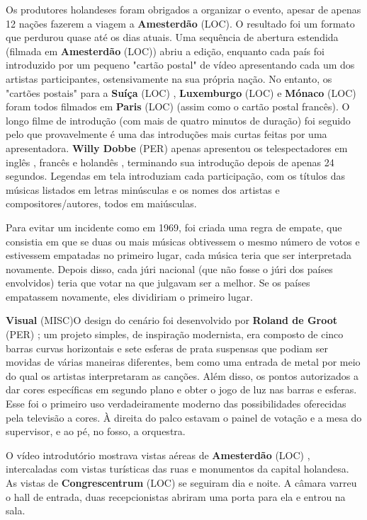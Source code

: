 \documentclass[12pt,a4paper]{article}
\begin{document}
Os produtores holandeses foram obrigados a organizar o evento, apesar de apenas 12 nações fazerem a viagem a \textbf{Amesterdão} (LOC). O resultado foi um formato que perdurou quase até os dias atuais. Uma sequência de abertura estendida (filmada em \textbf{Amesterdão} (LOC)) abriu a edição, enquanto cada país foi introduzido por um pequeno "cartão postal" de vídeo apresentando cada um dos artistas participantes, ostensivamente na sua própria nação. No entanto, os "cartões postais" para a \textbf{Suíça} (LOC) , \textbf{Luxemburgo} (LOC) e \textbf{Mónaco} (LOC) foram todos filmados em \textbf{Paris} (LOC) (assim como o cartão postal francês). O longo filme de introdução (com mais de quatro minutos de duração) foi seguido pelo que provavelmente é uma das introduções mais curtas feitas por uma apresentadora. \textbf{Willy Dobbe} (PER) apenas apresentou os telespectadores em inglês , francês e holandês , terminando sua introdução depois de apenas 24 segundos. Legendas em tela introduziam cada participação, com os títulos das músicas listados em letras minúsculas e os nomes dos artistas e compositores/autores, todos em maiúsculas.

Para evitar um incidente como em 1969, foi criada uma regra de empate, que consistia em que se duas ou mais músicas obtivessem o mesmo número de votos e estivessem empatadas no primeiro lugar, cada música teria que ser interpretada novamente. Depois disso, cada júri nacional (que não fosse o júri dos países envolvidos) teria que votar na que julgavam ser a melhor. Se os países empatassem novamente, eles dividiriam o primeiro lugar.



\textbf{Visual} (MISC)O design do cenário foi desenvolvido por \textbf{Roland de Groot} (PER) ; um projeto simples, de inspiração modernista, era composto de cinco barras curvas horizontais e sete esferas de prata suspensas que podiam ser movidas de várias maneiras diferentes, bem como uma entrada de metal por meio do qual os artistas interpretaram as canções. Além disso, os pontos autorizados a dar cores específicas em segundo plano e obter o jogo de luz nas barras e esferas. Esse foi o primeiro uso verdadeiramente moderno das possibilidades oferecidas pela televisão a cores. À direita do palco estavam o painel de votação e a mesa do supervisor, e ao pé, no fosso, a orquestra.

O vídeo introdutório mostrava vistas aéreas de \textbf{Amesterdão} (LOC) , intercaladas com vistas turísticas das ruas e monumentos da capital holandesa. As vistas de \textbf{Congrescentrum} (LOC) se seguiram dia e noite. A câmara varreu o hall de entrada, duas recepcionistas abriram uma porta para ela e entrou na sala.
\end{document}
